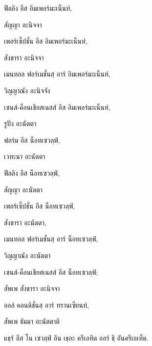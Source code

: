 \begin{english}
ฟีลลิง อีส อิมเพอร์มะเน็นท์,
\end{english}

สัญญา อะนิจจา

\begin{english}
เพอร์เซ็ปชั่น อีส อิมเพอร์มะเน็นท์,
\end{english}

สังขารา อะนิจจา

\begin{english}
เมนทอล ฟอร์เมชั่นสฺ อาร์ อิมเพอร์มะเน็นท์,
\end{english}

วิญญาณัง อะนิจจัง

\begin{english}
เซนส์-ค็อนเชียสเนสส์ อีส อิมเพอร์มะเน็นท์,
\end{english}

รูปัง อะนัตตา

\begin{english}
ฟอร์ม อีส น็อทเซวลฺฟ์,
\end{english}

เวทะนา อะนัตตา

\begin{english}
ฟีลลิง อีส น็อทเซวลฺฟ์,
\end{english}

สัญญา อะนัตตา

\begin{english}
เพอร์เซ็ปชั่น อีส น็อทเซวลฺฟ์,
\end{english}

สังขารา อะนัตตา,

\begin{english}
เมนทอล ฟอร์เมชั่นสฺ อาร์ น็อทเซวลฺฟ์,
\end{english}

วิญญาณัง อะนัตตา

\begin{english}
เซนส์-ค็อนเชียสเนสส์ อีส น็อทเซวลฺฟ์;
\end{english}

สัพเพ สังขารา อะนิจจา

\begin{english}
ออล์ คอนดิชั่นสฺ อาร์ ทรานเซียนท์,
\end{english}

สัพเพ ธัมมา อะนัตตาติ

\begin{english}
แธฺร์ อีส โน เซวลฺฟ์ อิน เธฺอะ ครีเอทิด ออร์ ธฺิ อันครีเอเท็ด.
\end{english}

